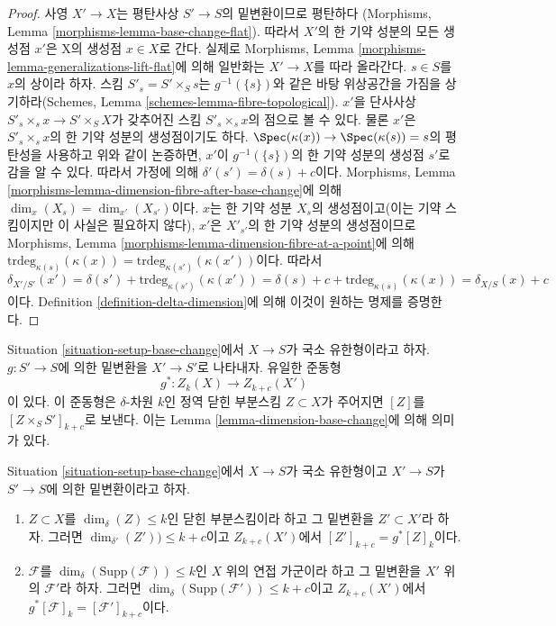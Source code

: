 \begin{proof}
사영 $X' \to X$는 평탄사상 $S' \to S$의 밑변환이므로 평탄하다
(Morphisms, Lemma \ref{morphisms-lemma-base-change-flat}).
따라서 $X'$의 한 기약 성분의 모든 생성점 $x'$은 X의 생성점
$x \in X$로 간다. 실제로 Morphisms, Lemma
\ref{morphisms-lemma-generalizations-lift-flat}에 의해 일반화는
$X' \to X$를 따라 올라간다. $s \in S$를 $x$의 상이라 하자.
스킴 $S'_s = S' \times_S s$는 $g^{-1}(\{s\})$와 같은 바탕 위상공간을
가짐을 상기하라(Schemes, Lemma
\ref{schemes-lemma-fibre-topological}). $x'$을 단사사상
$S'_s \times_s x \to S' \times_S X$가 갖추어진 스킴
$S'_s \times_s x$의 점으로 볼 수 있다. 물론 $x'$은
$S'_s \times_s x$의 한 기약 성분의 생성점이기도 하다.
$\Spec(\kappa(x)) \to \Spec(\kappa(s)) = s$의 평탄성을 사용하고
위와 같이 논증하면, $x'$이 $g^{-1}(\{s\})$의 한 기약 성분의 생성점
$s'$로 감을 알 수 있다. 따라서 가정에 의해
$\delta'(s') = \delta(s) + c$이다. Morphisms, Lemma
\ref{morphisms-lemma-dimension-fibre-after-base-change}에 의해
$\dim_x(X_s) = \dim_{x'}(X_{s'})$이다. $x$는 한 기약 성분 $X_s$의
생성점이고(이는 기약 스킴이지만 이 사실은 필요하지 않다), $x'$은
$X'_{s'}$의 한 기약 성분의 생성점이므로 Morphisms, Lemma
\ref{morphisms-lemma-dimension-fibre-at-a-point}에 의해
$\text{trdeg}_{\kappa(s)}(\kappa(x)) = 
\text{trdeg}_{\kappa(s')}(\kappa(x'))$이다. 따라서
$$
\delta_{X'/S'}(x') = \delta(s') + \text{trdeg}_{\kappa(s')}(\kappa(x')) =
\delta(s) + c + \text{trdeg}_{\kappa(s)}(\kappa(x)) = \delta_{X/S}(x) + c
$$
이다. Definition \ref{definition-delta-dimension}에 의해 이것이 원하는
명제를 증명한다.
\end{proof}

\noindent
Situation \ref{situation-setup-base-change}에서 $X \to S$가 국소
유한형이라고 하자. $g : S' \to S$에 의한 밑변환을 $X' \to S'$로
나타내자. 유일한 준동형
$$
g^* : Z_k(X) \longrightarrow Z_{k + c}(X')
$$
이 있다. 이 준동형은 $\delta$-차원 $k$인 정역 닫힌 부분스킴
$Z \subset X$가 주어지면 $[Z]$를 $[Z \times_S S']_{k + c}$로
보낸다. 이는 Lemma \ref{lemma-dimension-base-change}에 의해 의미가
있다.

\begin{lemma}
\label{lemma-pullback-coherent-base-change}
Situation \ref{situation-setup-base-change}에서 $X \to S$가 국소
유한형이고 $X' \to S$가 $S' \to S$에 의한 밑변환이라고 하자.
\begin{enumerate}
\item $Z \subset X$를 $\dim_\delta(Z) \leq k$인 닫힌 부분스킴이라
하고 그 밑변환을 $Z' \subset X'$라 하자. 그러면
$\dim_{\delta'}(Z')) \leq k + c$이고
$Z_{k + c}(X')$에서 $[Z']_{k + c} = g^*[Z]_k$이다.
\item $\mathcal{F}$를
$\dim_\delta(\text{Supp}(\mathcal{F})) \leq k$인 $X$ 위의
연접 가군이라 하고 그 밑변환을 $X'$ 위의 $\mathcal{F}'$라 하자.
그러면 $\dim_\delta(\text{Supp}(\mathcal{F}')) \leq k + c$이고
$Z_{k + c}(X')$에서
$g^*[\mathcal{F}]_k = [\mathcal{F}']_{k + c}$이다.
\end{enumerate}
\end{lemma}


